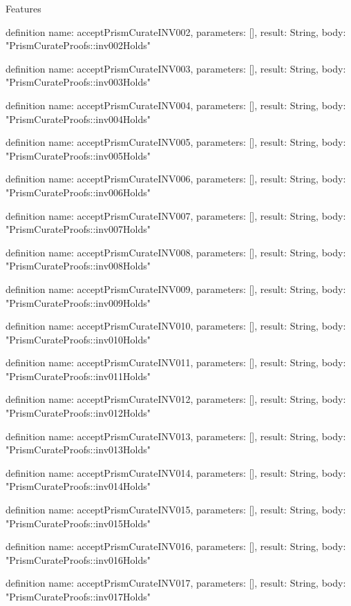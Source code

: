 \begin{lexlean}{Features}
\begin{semanticmodule}
definition{
  name: acceptPrismCurateINV002,
  parameters: [],
  result: String,
  body: "PrismCurateProofs::inv002Holds"
}

definition{
  name: acceptPrismCurateINV003,
  parameters: [],
  result: String,
  body: "PrismCurateProofs::inv003Holds"
}

definition{
  name: acceptPrismCurateINV004,
  parameters: [],
  result: String,
  body: "PrismCurateProofs::inv004Holds"
}

definition{
  name: acceptPrismCurateINV005,
  parameters: [],
  result: String,
  body: "PrismCurateProofs::inv005Holds"
}

definition{
  name: acceptPrismCurateINV006,
  parameters: [],
  result: String,
  body: "PrismCurateProofs::inv006Holds"
}

definition{
  name: acceptPrismCurateINV007,
  parameters: [],
  result: String,
  body: "PrismCurateProofs::inv007Holds"
}

definition{
  name: acceptPrismCurateINV008,
  parameters: [],
  result: String,
  body: "PrismCurateProofs::inv008Holds"
}

definition{
  name: acceptPrismCurateINV009,
  parameters: [],
  result: String,
  body: "PrismCurateProofs::inv009Holds"
}

definition{
  name: acceptPrismCurateINV010,
  parameters: [],
  result: String,
  body: "PrismCurateProofs::inv010Holds"
}

definition{
  name: acceptPrismCurateINV011,
  parameters: [],
  result: String,
  body: "PrismCurateProofs::inv011Holds"
}

definition{
  name: acceptPrismCurateINV012,
  parameters: [],
  result: String,
  body: "PrismCurateProofs::inv012Holds"
}

definition{
  name: acceptPrismCurateINV013,
  parameters: [],
  result: String,
  body: "PrismCurateProofs::inv013Holds"
}

definition{
  name: acceptPrismCurateINV014,
  parameters: [],
  result: String,
  body: "PrismCurateProofs::inv014Holds"
}

definition{
  name: acceptPrismCurateINV015,
  parameters: [],
  result: String,
  body: "PrismCurateProofs::inv015Holds"
}

definition{
  name: acceptPrismCurateINV016,
  parameters: [],
  result: String,
  body: "PrismCurateProofs::inv016Holds"
}

definition{
  name: acceptPrismCurateINV017,
  parameters: [],
  result: String,
  body: "PrismCurateProofs::inv017Holds"
}


\end{semanticmodule}
\end{lexlean}
